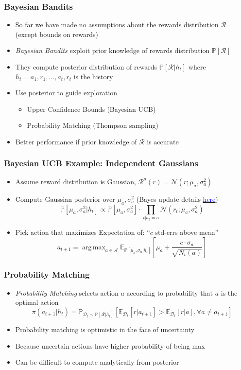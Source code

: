 \documentclass[handout]{beamer}
\DeclareMathOperator*{\argmax}{arg\,max}
\begin{document}
\begin{frame}
\frametitle{Bayesian Bandits}
\pause
\begin{itemize}
\item So far we have made no assumptions about the rewards distribution $\mathcal{R}$ (except bounds on rewards)
\item {\em Bayesian Bandits} exploit prior knowledge of rewards distribution $\mathbb{P}[\mathcal{R}]$
\item They compute posterior distribution of rewards $\mathbb{P}[\mathcal{R}|h_t]$ where $h_t = a_1,r_1, \ldots, a_t, r_t$ is the history
\item Use posterior to guide exploration
\begin{itemize}
\item Upper Confidence Bounds (Bayesian UCB)
\item Probability Matching (Thompson sampling)
\end{itemize}
\item Better performance if prior knowledge of $\mathcal{R}$ is accurate
\end{itemize}
\end{frame}

\begin{frame}
\frametitle{Bayesian UCB Example: Independent Gaussians}
\pause
\begin{itemize}[<+->]
\item Assume reward distribution is Gaussian, $\mathcal{R}^a(r) =\mathcal{N}(r;\mu_a, \sigma_a^2)$
\item Compute Gaussian posterior over $\mu_a,\sigma_a^2$  (Bayes update details \href{https://people.eecs.berkeley.edu/~jordan/courses/260-spring10/lectures/lecture5.pdf}{\underline{\textcolor{blue}{here}}})
$$\mathbb{P}[\mu_a, \sigma_a^2|h_t] \propto \mathbb{P}[\mu_a, \sigma_a^2] \cdot \prod_{t|a_t=a} \mathcal{N}(r_t;\mu_a, \sigma_a^2)$$
\item Pick action that maximizes Expectation of:  ``$c$ std-errs above mean''
$$a_{t+1} = \argmax_{a\in\mathcal{A}} \mathbb{E}_{\mathbb{P}[\mu_a, \sigma_a|h_t]}[\mu_a + \frac {c \cdot \sigma_a} {\sqrt{N_t(a)}}]$$
\end{itemize}
\end{frame}


\begin{frame}
\frametitle{Probability Matching}
\pause
\begin{itemize}[<+->]
\item {\em Probability Matching} selects action $a$ according to probability that $a$ is the optimal action
$$\pi(a_{t+1}|h_t) = \mathbb{P}_{\mathcal{D}_t\sim \mathbb{P}[\mathcal{R}|h_t]}[\mathbb{E}_{\mathcal{D}_t}[r|a_{t+1}] > \mathbb{E}_{\mathcal{D}_t}[r|a], \forall a \neq a_{t+1}]$$
\item Probability matching is optimistic in the face of uncertainty
\item Because uncertain actions have higher probability of being max
\item Can be difficult to compute analytically from posterior
\end{itemize}
\end{frame}
\end{document}
